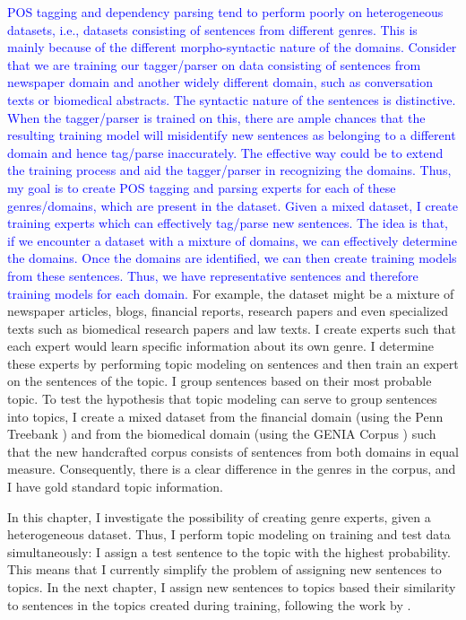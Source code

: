 \textcolor{blue}{POS tagging and dependency parsing tend to perform poorly on heterogeneous datasets, i.e., datasets consisting of sentences from different genres. This is mainly because of the different morpho-syntactic nature of the domains. Consider that we are training our tagger/parser on data consisting of sentences from newspaper domain and another widely different domain, such as conversation texts or biomedical abstracts. The syntactic nature of the sentences is distinctive. When the tagger/parser is trained on this, there are ample chances that the resulting training model will misidentify new sentences as belonging to a different domain and hence tag/parse inaccurately. The effective way could be to extend the training process and aid the tagger/parser in recognizing the domains. Thus, my goal is to create POS tagging and parsing experts for each of these genres/domains, which are present in the dataset. Given a mixed dataset, I create training experts which can effectively tag/parse new sentences. The idea is that, if we encounter a dataset with a mixture of domains, we can effectively determine the domains. Once the domains are identified, we can then create training models from these sentences. Thus, we have representative sentences and therefore training models for each domain. }
For example, the dataset might be a mixture of newspaper articles, blogs, financial reports, research papers and even specialized texts such as biomedical research papers and law texts. I create experts such that each expert would learn specific information about its own genre. I determine these experts by performing topic modeling on sentences and then train an expert on the sentences of the topic. I group sentences based on their most probable topic. To test the hypothesis that topic modeling can serve to group sentences into topics, I create a mixed dataset from the financial domain (using the Penn Treebank \cite{marcus:kim:ea:94}) and from the biomedical domain (using the GENIA Corpus \cite{tateisi:tsujii:04}) such that the new handcrafted corpus consists of sentences from both domains in equal measure. Consequently, there is a clear difference in the genres in the corpus, and I have gold standard topic information.

In this chapter, I investigate the possibility of creating genre experts, given a heterogeneous dataset. Thus, I perform topic modeling on training and test data simultaneously: I assign a test sentence to the topic with the highest probability. This means that I currently simplify the problem of assigning new sentences to topics. In the next chapter, I assign new sentences to topics based their similarity to sentences in the topics created during training, following the work by \citep{plank2011effective}. 

